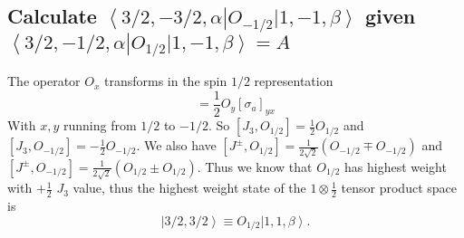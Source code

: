 \documentclass[main.tex]{subfiles}
\begin{document}
\subsection{Calculate $\left<3/2,-3/2,\alpha\right|O_{-1/2}\left|1,-1,\beta\right>$ given $\left<3/2,-1/2,\alpha\right|O_{1/2}\left|1,-1,\beta\right>=A$}
The operator $O_x$ transforms in the spin $1/2$ representation
\begin{equation}
[J_a,O_x]=\frac{1}{2}O_y[\sigma_a]_{yx}
\end{equation}
With $x,y$ running from $1/2$ to $-1/2$. So $[J_3,O_{1/2}]=\frac{1}{2}O_{1/2}$ and $[J_3,O_{-1/2}]=-\frac{1}{2}O_{-1/2}$. We also have $[J^{\pm},O_{1/2}]=\frac{1}{2\sqrt{2}}(O_{-1/2}\mp O_{-1/2})$ and $[J^{\pm},O_{-1/2}]=\frac{1}{2\sqrt{2}}(O_{1/2}\pm O_{1/2})$.
Thus we know that $O_{1/2}$ has highest weight with $+\frac{1}{2}$ $J_3$ value, thus the highest weight state of the $1\otimes\frac{1}{2}$ tensor product space is 
\begin{equation}
\left|3/2,3/2\right>\equiv O_{1/2}\left|1,1,\beta\right>.
\end{equation}
\end{document}
